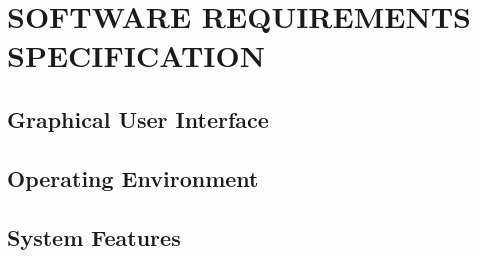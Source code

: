 \section{ SOFTWARE REQUIREMENTS SPECIFICATION }
\subsection{ Graphical User Interface }
\subsection{ Operating Environment }
\subsection{ System Features }